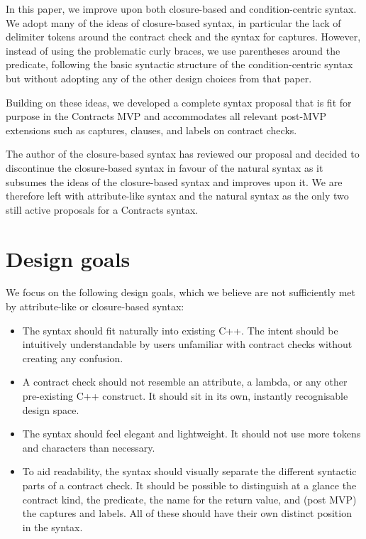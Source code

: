 In this paper, we improve upon both closure-based and condition-centric syntax. We adopt many of the ideas of closure-based syntax, in particular the lack of delimiter tokens around the contract check and the syntax for captures. However, instead of using the problematic curly braces, we use parentheses around the predicate, following the basic syntactic structure of the condition-centric syntax \cite{P2737R0} but without adopting any of the other design choices from that paper.

Building on these ideas, we developed a complete syntax proposal that is fit for purpose in the Contracts MVP and accommodates all relevant post-MVP extensions such as captures,  clauses, and labels on contract checks.

The author of the closure-based syntax has reviewed our proposal and decided to discontinue the closure-based syntax in favour of the natural syntax as it subsumes the ideas of the closure-based syntax and improves upon it. We are therefore left with attribute-like syntax and the natural syntax as the only two still active proposals for a Contracts syntax.



\section{Design goals}
\label{sec:design}

We focus on the following design goals, which we believe are not sufficiently met by attribute-like or closure-based syntax:

\begin{itemize}
\item The syntax should fit naturally into existing C++. The intent should be intuitively understandable by users unfamiliar with contract checks without creating any confusion.
\item A contract check should not resemble an attribute, a lambda, or any other pre-existing C++ construct. It should sit in its own, instantly recognisable design space.
\item The syntax should feel elegant and lightweight. It should not use more tokens and characters than necessary.
\item To aid readability, the syntax should visually separate the different syntactic parts of a contract check. It should be possible to distinguish at a glance the contract kind, the predicate, the name for the return value, and (post MVP) the captures and labels. All of these should have their own distinct position in the syntax.
\end{itemize}

